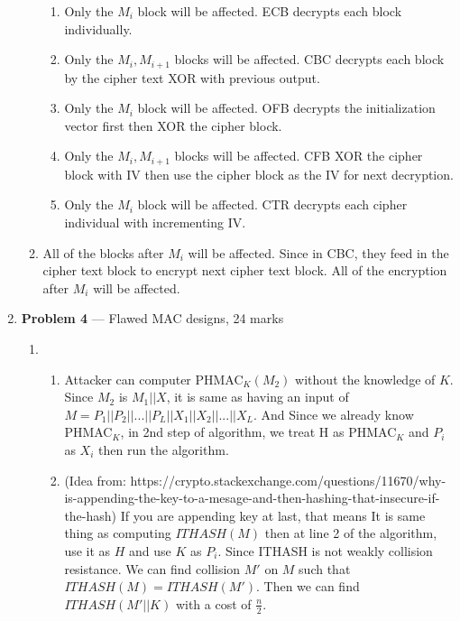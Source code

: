 \documentclass[11pt]{article}
\theoremstyle{definition}
\begin{document}
\begin{enumerate}
\begin{enumerate}
		\begin{enumerate}
			\item %
			Only the $M_i$ block will be affected. ECB decrypts each block individually.
			\item %
			Only the $M_i,M_{i+1}$ blocks will be affected. CBC decrypts each block by the cipher text XOR with previous output.
			\item %
			Only the $M_i$ block will be affected. OFB decrypts the initialization vector first then XOR the cipher block.
			\item %
			Only the $M_i,M_{i+1}$ blocks will be affected. CFB XOR the cipher block with IV then use the cipher block as the IV for next decryption. 
			\item %
			Only the $M_i$ block will be affected. CTR decrypts each cipher individual with incrementing IV.
		
		\end{enumerate}
		
		\item %
			All of the blocks after $M_i$ will be affected. Since in CBC, they feed in the cipher text block to encrypt next cipher text block. All of the encryption after $M_i$ will be affected.
	
	\end{enumerate}
	
	\newpage
	\item[] \textbf{Problem 4} --- Flawed MAC designs, 24 marks
	
	\begin{enumerate}
	
		\item %
		
		\begin{enumerate}
			\item %
				Attacker can computer PHMAC$_K(M_2)$ without the knowledge of $K$. Since $M_2$ is $M_1||X$, it is same as having an input of $M = P_1||P_2||...||P_L||X_1||X_2||...||X_L$. And Since we already know PHMAC$_K$, in 2nd step of algorithm, we treat H as PHMAC$_K$ and $P_i$ as $X_i$ then run the algorithm.
			\item %
			(Idea from: https://crypto.stackexchange.com/questions/11670/why-is-appending-the-key-to-a-mesage-and-then-hashing-that-insecure-if-the-hash)\newline
			If you are appending key at last, that means It is same thing as computing $ITHASH(M)$ then at line 2 of the algorithm, use it as $H$ and use $K$ as $P_i$. Since ITHASH is not weakly collision resistance. We can find collision $M'$ on $M$ such that $ITHASH(M) = ITHASH(M')$. Then we can find $ITHASH(M'||K)$ with a cost of $\frac{n}{2}$.
		\end{enumerate}
		

\end{enumerate}
\end{enumerate}
\end{document}
